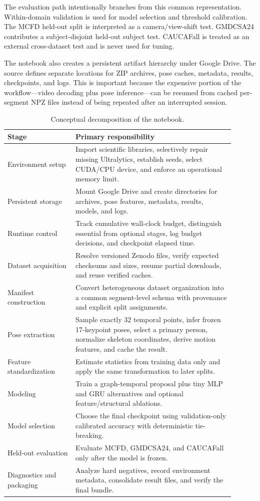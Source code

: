 \documentclass[11pt,a4paper]{article}
\begin{document}
The evaluation path intentionally branches from this common representation. Within-domain validation is used for model selection and threshold calibration. The MCFD held-out split is interpreted as a camera/view-shift test. GMDCSA24 contributes a subject-disjoint held-out subject test. CAUCAFall is treated as an external cross-dataset test and is never used for tuning.

The notebook also creates a persistent artifact hierarchy under Google Drive. The source defines separate locations for ZIP archives, pose caches, metadata, results, checkpoints, and logs. This is important because the expensive portion of the workflow---video decoding plus pose inference---can be resumed from cached per-segment NPZ files instead of being repeated after an interrupted session.

\begin{table}[ht]
\centering
\small
\begin{tabular}{p{0.27\linewidth}p{0.63\linewidth}}
\toprule
\textbf{Stage} & \textbf{Primary responsibility} \\
\midrule
Environment setup & Import scientific libraries, selectively repair missing Ultralytics, establish seeds, select CUDA/CPU device, and enforce an operational memory limit. \\
Persistent storage & Mount Google Drive and create directories for archives, pose features, metadata, results, models, and logs. \\
Runtime control & Track cumulative wall-clock budget, distinguish essential from optional stages, log budget decisions, and checkpoint elapsed time. \\
Dataset acquisition & Resolve versioned Zenodo files, verify expected checksums and sizes, resume partial downloads, and reuse verified caches. \\
Manifest construction & Convert heterogeneous dataset organization into a common segment-level schema with provenance and explicit split assignments. \\
Pose extraction & Sample exactly 32 temporal points, infer frozen 17-keypoint poses, select a primary person, normalize skeleton coordinates, derive motion features, and cache the result. \\
Feature standardization & Estimate statistics from training data only and apply the same transformation to later splits. \\
Modeling & Train a graph-temporal proposal plus tiny MLP and GRU alternatives and optional feature/structural ablations. \\
Model selection & Choose the final checkpoint using validation-only calibrated accuracy with deterministic tie-breaking. \\
Held-out evaluation & Evaluate MCFD, GMDCSA24, and CAUCAFall only after the model is frozen. \\
Diagnostics and packaging & Analyze hard negatives, record environment metadata, consolidate result files, and verify the final bundle. \\
\bottomrule
\end{tabular}
\caption{Conceptual decomposition of the notebook.}
\end{table}
\end{document}
